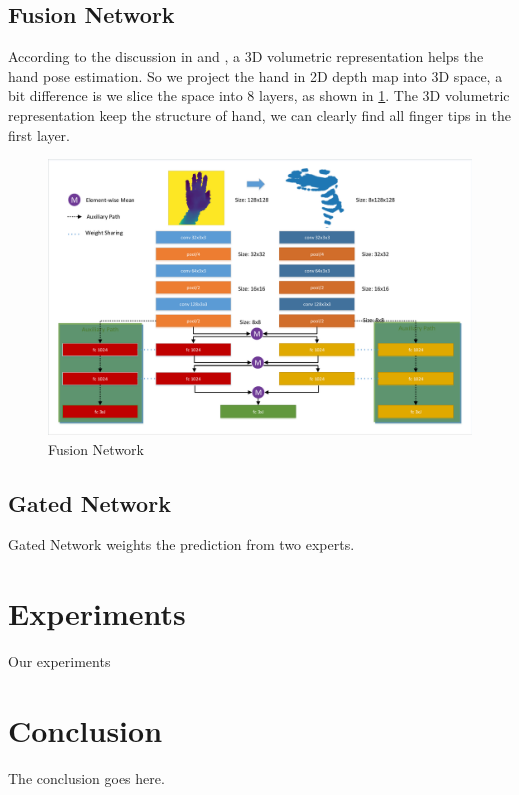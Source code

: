 \documentclass[journal,comsoc]{IEEEtran}
\let\MYoriglatexcaption\caption
\renewcommand{\caption}[2][\relax]{\MYoriglatexcaption[#2]{#2}}
\begin{document}
\subsection{Fusion Network}\label{sec:fusion network}
According to the discussion in \cite{supancic2015depth} and \cite{deng2017hand3d}, a 3D volumetric representation helps the hand pose estimation. 
So we project the hand in 2D depth map into 3D space, a bit difference is we slice the space into 8 layers, as shown in \ref{fig:fusion network}. 
The 3D volumetric representation keep the structure of hand, we can clearly find all finger tips in the first layer.
\begin{figure}[t]
    \centering
    \includegraphics[width=1\linewidth]{src/network/fusion.pdf}
    \caption{Fusion Network}
\label{fig:fusion network}
\end{figure}

\subsection{Gated Network}\label{sec:gated network}
Gated Network weights the prediction from two experts.



\section{Experiments}\label{sec:experiments}
Our experiments
\section{Conclusion}\label{sec:conclusion}
The conclusion goes here.
\end{document}
